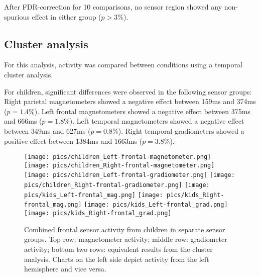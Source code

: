 After FDR-correction for 10 comparisons, no sensor region showed any non-spurious effect in either group ($p > 3\%$).

\subsection{Cluster analysis}
For this analysis, activity was compared between conditions using a temporal cluster analysis.

For children, significant differences were observed in the following sensor groups:
Right parietal magnetometers showed a negative effect between 159ms and 374ms ($p = 1.4\%$).
Left frontal magnetometers showed a negative effect between 375ms and 666ms ($p = 1.8\%$).
Left temporal magnetometers showed a negative effect between 349ms and 627ms ($p = 0.8\%$).
Right temporal gradiometers showed a positive effect between 1384ms and 1663ms ($p = 3.8\%$).

\begin{figure}[h]
\begin{center}
\texttt{[image: pics/children\_Left-frontal-magnetometer.png]}
\texttt{[image: pics/children\_Right-frontal-magnetometer.png]}
\texttt{[image: pics/children\_Left-frontal-gradiometer.png]}
\texttt{[image: pics/children\_Right-frontal-gradiometer.png]}
\texttt{[image: pics/kids\_Left-frontal\_mag.png]}
\texttt{[image: pics/kids\_Right-frontal\_mag.png]}
\texttt{[image: pics/kids\_Left-frontal\_grad.png]}
\texttt{[image: pics/kids\_Right-frontal\_grad.png]}
\caption{\label{4.2.activity.kids.frontal} Combined frontal sensor activity from children in separate sensor groups. Top row: magnetometer activity; middle row: gradiometer activity; bottom two rows: equivalent results from the cluster analysis. Charts on the left side depict activity from the left hemisphere and vice versa.}
\end{center}
\end{figure}


